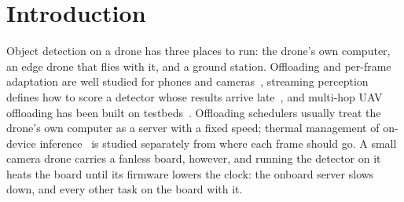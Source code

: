 \documentclass[conference]{IEEEtran}
\begin{document}
\begin{abstract}
power gap to the planner at equivalent accuracy. Recalibrated per path on two days of board logs, the deadline probability's calibration error on a third, held-out day falls from \RcEceRaw{} to \RcPathEceJet--\RcPathEceLap, which also removes most of that rule's cost on one hop. The price update carries a sample-path guarantee:
mean power stays below the budget plus a price term and a hold-and-cap term. All \ThmUpdates{} logged updates of the
\ThmRuns{} priced runs follow the coded rule, so the bound holds on every run (an excess of at most \ThmMeshExcess~W on
the mesh and \ThmLongExcess~W over 24 minutes, where the price sat at its cap). Through a measured thermal model the
budget sets the board's mean temperature (within \ThMae~$^\circ$C on the boards the model was fitted on; another board
needs its own intercept). Its objective must use
the decay curve of the forecaster that runs: with the curve without forecasting it loses \MainNoFcLoss{}~sAP.
\end{abstract}

\section{Introduction}
Object detection on a drone has three places to run: the drone's own computer, an edge drone that flies with it, and a
ground station. Offloading and per-frame adaptation are well studied for phones and cameras~\cite{Ra_2011,Chen_2015,Zhang_2021},
streaming perception defines how to score a detector whose results arrive late~\cite{Li_2020,Yang_2022}, and multi-hop
UAV offloading has been built on testbeds~\cite{Coletta_2023}. Offloading schedulers usually treat the drone's own
computer as a server with a fixed speed; thermal management of on-device inference~\cite{Jeon_2026} is studied
separately from where each frame should go. A small camera drone carries a fanless board, however, and running the detector on it heats
the board until its firmware lowers the clock: the onboard server slows down, and every other task on the board with it.
\end{document}
